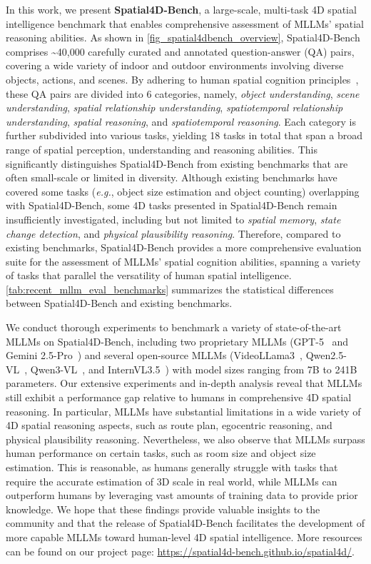 \documentclass{article}
\newcommand{\eg}{\textit{e.g.}}
\begin{document}
In this work, we present \textbf{Spatial4D-Bench}, a large-scale, multi-task 4D spatial intelligence benchmark that enables comprehensive assessment of MLLMs' spatial reasoning abilities. As shown in \cref{fig_spatial4dbench_overview}, Spatial4D-Bench comprises \textasciitilde40,000 carefully curated and annotated question-answer (QA) pairs, covering a wide variety of indoor and outdoor environments involving diverse objects, actions, and scenes.
By adhering to human spatial cognition principles~\cite{waller2013handbook, newcombe2004spatial}, these QA pairs are divided into 6 categories, namely, \textit{object understanding}, \textit{scene understanding}, \textit{spatial relationship understanding}, \textit{spatiotemporal relationship understanding}, \textit{spatial reasoning}, and \textit{spatiotemporal reasoning}.
Each category is further subdivided into various tasks, yielding 18 tasks in total that span a broad range of spatial perception, understanding and reasoning abilities.
This significantly distinguishes Spatial4D-Bench from existing benchmarks that are often small-scale or limited in diversity.
Although existing benchmarks have covered some tasks (\eg, object size estimation and object counting) overlapping with Spatial4D-Bench, some 4D tasks presented in Spatial4D-Bench remain insufficiently investigated, including but not limited to \textit{spatial memory}, \textit{state change detection}, and \textit{physical plausibility reasoning}.
Therefore, compared to existing benchmarks, Spatial4D-Bench provides a more comprehensive evaluation suite for the assessment of MLLMs' spatial cognition abilities, spanning a variety of tasks that parallel the versatility of human spatial intelligence. 
\cref{tab:recent_mllm_eval_benchmarks} summarizes the statistical differences between Spatial4D-Bench and existing benchmarks.

We conduct thorough experiments to benchmark a variety of state-of-the-art MLLMs on Spatial4D-Bench, including two proprietary MLLMs (GPT-5~\cite{OpenAI2025} and Gemini 2.5-Pro~\cite{Gemini2025}) and several open-source MLLMs (VideoLLama3~\cite{zhang2025videollama}, Qwen2.5-VL~\cite{bai2025qwen2}, Qwen3-VL~\cite{bai2025qwen2}, and InternVL3.5~\cite{wang2025internvl3}) with model sizes ranging from 7B to 241B parameters.
Our extensive experiments and in-depth analysis reveal that MLLMs still exhibit a performance gap relative to humans in comprehensive 4D spatial reasoning.
In particular, MLLMs have substantial limitations in a wide variety of 4D spatial reasoning aspects, such as route plan, egocentric reasoning, and physical plausibility reasoning.
Nevertheless, we also observe that MLLMs surpass human performance on certain tasks, such as room size and object size estimation.
This is reasonable, as humans generally struggle with tasks that require the accurate estimation of 3D scale in real world, while MLLMs can outperform humans by leveraging vast amounts of training data to provide prior knowledge.
We hope that these findings provide valuable insights to the community and that the release of Spatial4D-Bench facilitates the development of more capable MLLMs toward human-level 4D spatial intelligence.
More resources can be found on our project page: \url{https://spatial4d-bench.github.io/spatial4d/}.
\end{document}
